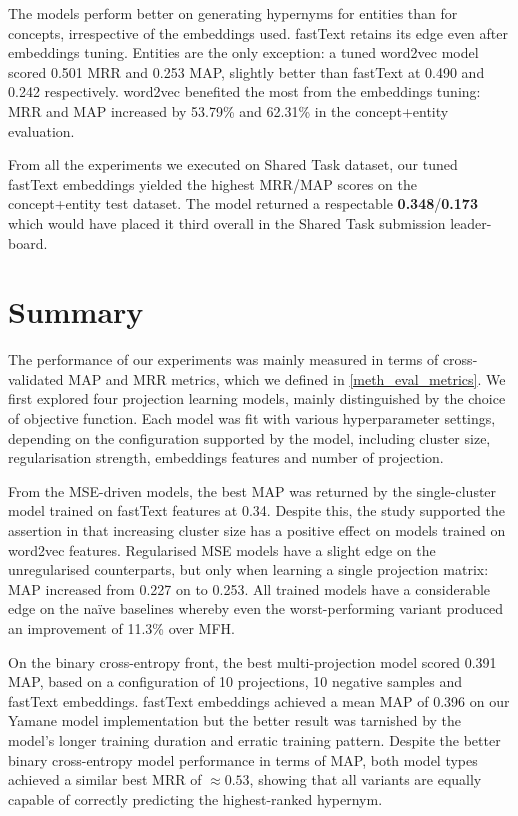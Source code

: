 The models perform better on generating hypernyms for entities than for concepts, irrespective of the embeddings used.  fastText retains its edge even after embeddings tuning.  Entities are the only exception: a tuned word2vec model scored 0.501 \ac{MRR} and 0.253 \ac{MAP}, slightly better than fastText at 0.490 and 0.242 respectively.  word2vec benefited the most from the embeddings tuning: \ac{MRR} and \ac{MAP} increased by 53.79\% and 62.31\% in the concept+entity evaluation. 

From all the experiments we executed on Shared Task dataset, our tuned fastText embeddings yielded the highest MRR/MAP scores on the concept+entity test dataset.  The model returned a respectable \textbf{0.348}/\textbf{0.173} which would have placed it third overall in the Shared Task submission leader-board.

\section{Summary}
The performance of our experiments was mainly measured in terms of cross-validated \ac{MAP} and \ac{MRR} metrics, which we defined in \cref{meth_eval_metrics}.  We first explored four projection learning models, mainly distinguished by the choice of objective function.  Each model was fit with various hyperparameter settings, depending on the configuration supported by the model, including cluster size, regularisation strength, embeddings features and number of projection.

From the MSE-driven models, the best MAP was returned by the single-cluster model trained on fastText features at 0.34. Despite this, the study supported the assertion in \citep{Fu2014} that increasing cluster size has a positive effect on models trained on word2vec features. 
Regularised MSE models have a slight edge on the unregularised counterparts, but only when learning a single projection matrix: MAP increased from 0.227 on to 0.253.  All trained models have a considerable edge on the na\"ive baselines whereby even the worst-performing variant produced an improvement of 11.3\% over \ac{MFH}.

On the binary cross-entropy front, the best multi-projection model  scored 0.391 MAP, based on a configuration of 10 projections, 10 negative samples and fastText embeddings.  fastText embeddings achieved a mean MAP of 0.396 on our Yamane \citep{yamane2016distributional} model implementation but the better result was tarnished by the model's longer training duration and erratic training pattern.  Despite the better binary cross-entropy model performance in terms of MAP, both model types achieved a similar best MRR of $\approx 0.53$, showing that all variants are equally capable of correctly predicting the highest-ranked hypernym.


